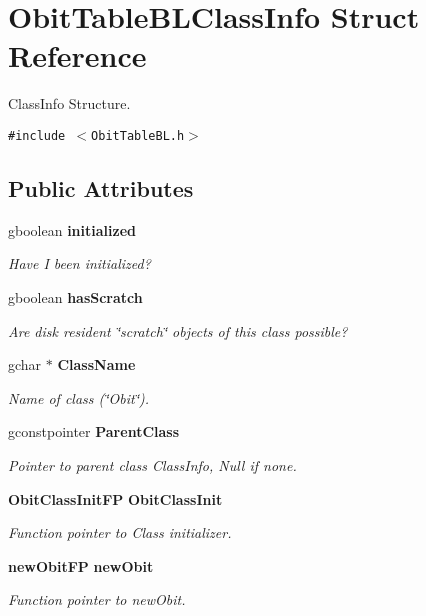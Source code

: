 \section{Obit\-Table\-BLClass\-Info Struct Reference}
\label{structObitTableBLClassInfo}
Class\-Info Structure.  


{\tt \#include $<$Obit\-Table\-BL.h$>$}

\subsection*{Public Attributes}
\begin{CompactItemize}
\item 
gboolean {\bf initialized}
\begin{CompactList}\small\item\em Have I been initialized? \item\end{CompactList}\item 
gboolean {\bf has\-Scratch}
\begin{CompactList}\small\item\em Are disk resident \char`\"{}scratch\char`\"{} objects of this class possible? \item\end{CompactList}\item 
gchar $\ast$ {\bf Class\-Name}
\begin{CompactList}\small\item\em Name of class (\char`\"{}Obit\char`\"{}). \item\end{CompactList}\item 
gconstpointer {\bf Parent\-Class}
\begin{CompactList}\small\item\em Pointer to parent class Class\-Info, Null if none. \item\end{CompactList}\item 
{\bf Obit\-Class\-Init\-FP} {\bf Obit\-Class\-Init}
\begin{CompactList}\small\item\em Function pointer to Class initializer. \item\end{CompactList}\item 
{\bf new\-Obit\-FP} {\bf new\-Obit}
\begin{CompactList}\small\item\em Function pointer to new\-Obit. \item\end{CompactList}\item 

\end{CompactItemize}

